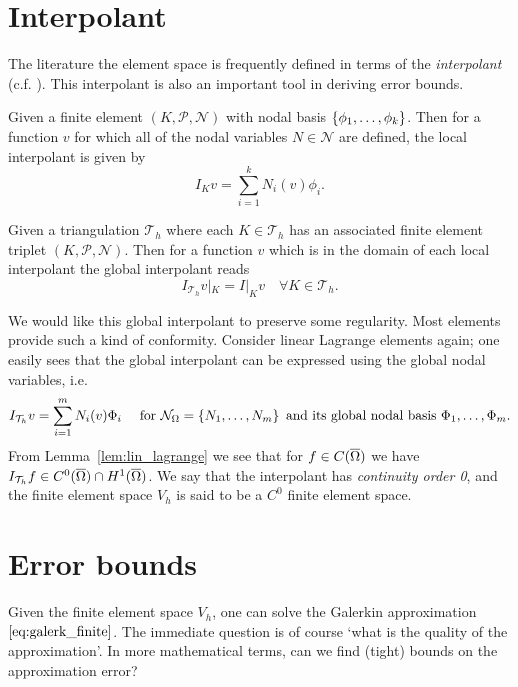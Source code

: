 \documentclass[thesis.tex]{subfiles}
\begin{document}
\section{Interpolant}
\label{sec:apriori}
The literature the element space is frequently defined in terms of the \emph{interpolant} (c.f. \cite[Ch~3]{brenner}). This interpolant is also
  an important tool in deriving error bounds. 
  \begin{defn}
    Given a finite element $(K, \mathcal{P}, \mathcal{N})$ with nodal basis $\set{\phi_1,\dots, \phi_k}$. Then for a function $v$ for which all of the nodal variables $N \in \mathcal{N}$ are defined, the local interpolant is given by
    \[
      I_K v = \sum_{i = 1}^k N_i(v)\phi_i.
    \]
  \end{defn}
  \begin{defn}
    Given a triangulation $\mathcal{T}_h$ where each $K \in \mathcal{T}_h$ has an associated finite element triplet $(K, \mathcal{P}, \mathcal{N})$. Then for
    a function $v$ which is in the domain of each local interpolant the global interpolant reads
    \[
      I_{\mathcal{T}_h} v |_K = I|_K v \quad \forall K \in \mathcal{T}_h.
    \]
  \end{defn}
  We would like this global interpolant to preserve some regularity. Most elements provide such a kind of conformity. Consider
  linear Lagrange elements again; one easily sees that the global interpolant can be expressed using the global nodal variables, i.e.
    \[
      I_{\mathcal{T}_h} v = \sum_{i=1}^m N_i(v)\Phi_i \quad \text{ for } \mathcal{N}_\Omega =\set{N_1, \dots, N_m} \text{ and its global nodal basis } \Phi_1,\dots,\Phi_m.
    \]
    From Lemma~\ref{lem:lin_lagrange} we see that for $f \in C(\overline{\Omega})$ we have $I_{\mathcal{T}_h} f \in C^0(\overline{\Omega}) \cap H^1(\overline{\Omega})$. We say
    that the interpolant has \emph{continuity order 0}, and the finite element space $V_h$ is said to be a $C^0$ finite element space.
  \section{Error bounds}
  Given the finite element space $V_h$, one can solve the Galerkin approximation $\eqref{eq:galerk_finite}$. The immediate
  question is of course `what is the quality of the approximation'. In more mathematical terms, can we find (tight) bounds
  on the approximation error?
\end{document}
